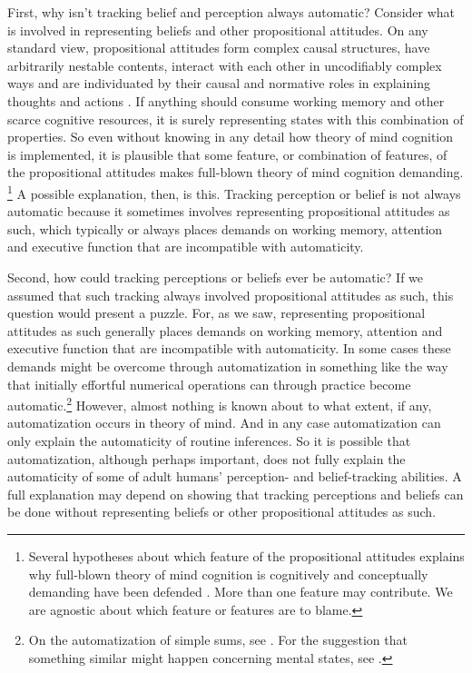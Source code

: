 \documentclass[12pt,\papersize]{extarticle}
\begin{document}
First, why isn't tracking belief and perception always automatic?
Consider what is involved in representing beliefs and other propositional attitudes.
On any standard view, propositional attitudes form complex causal structures, have arbitrarily nestable contents, interact with each other in uncodifiably complex ways and are individuated by their causal and normative roles in explaining thoughts and actions \citep[]{en_809, en_249}.  
If anything should consume working memory and other scarce cognitive resources, it is surely representing states with this combination of properties.
So even without knowing in any detail how theory of mind cognition is implemented, it is plausible that some feature, or combination of features, of the propositional attitudes  makes full-blown theory of mind cognition demanding.%
\footnote{
Several hypotheses about which feature of the propositional attitudes explains why full-blown theory of mind cognition is cognitively and conceptually demanding have been defended \citep[e.g.][]{en_1263, en_634, en_1269, en_78, en_81, en_404, 	%
	en_643, en_1130}.  
More than one feature may contribute. 
We are agnostic about which feature or features are to blame.
}  
%
A possible explanation, then, is this.
Tracking perception or belief is not always automatic because 
it sometimes involves representing propositional attitudes as such,
which typically or always places demands on working memory, attention and executive function  that are incompatible with automaticity.


Second, how could  tracking perceptions or beliefs ever be automatic?
If we assumed that such tracking always involved propositional attitudes as such, this question would present a puzzle.
For, as we saw, representing propositional attitudes as such generally places demands on working memory, attention and executive function that are incompatible with automaticity.
In some cases these demands might be overcome through automatization in something like the way that initially effortful numerical operations can through practice become automatic.\footnote{
On the automatization of simple sums, see \citet{lefevre:1988_cognitive}.
For the suggestion that something similar might happen concerning mental states, see \citet{Suddendorf:2003co}.
}
However, almost nothing is known about to what extent, if any, automatization occurs in theory of mind. 
And in any case automatization can only explain the automaticity of routine inferences.
So it is possible that automatization, although perhaps important, does not fully explain the automaticity of some of adult humans' perception- and belief-tracking abilities.
A full explanation may  depend on showing that tracking perceptions and beliefs can be done without  representing beliefs or other propositional attitudes as such.
\end{document}
